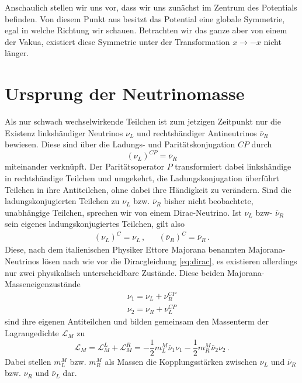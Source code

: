 Anschaulich stellen wir uns vor, dass wir uns zunächst im Zentrum des Potentials befinden.
Von diesem Punkt aus besitzt das Potential eine globale Symmetrie, egal in welche Richtung wir schauen.
Betrachten wir das ganze aber von einem der Vakua, existiert diese Symmetrie unter der Transformation $x \rightarrow -x$ nicht länger.

\section{Ursprung der Neutrinomasse} %

Als nur schwach wechselwirkende Teilchen ist zum jetzigen Zeitpunkt nur die Existenz linkshändiger Neutrinos $\nu_L$ und rechtshändiger Antineutrinos $\bar{\nu}_R$ bewiesen.
Diese sind über die Ladungs- und Paritätskonjugation $C P$ durch 
\begin{equation}
    (\nu_L)^{C P} = \bar{\nu}_R
    \label{eq:cpkonju}
\end{equation}
miteinander verknüpft.
Der Paritätsoperator $P$ transformiert dabei linkshändige in rechtshändige Teilchen und umgekehrt, die Ladungskonjugation überführt Teilchen in ihre Antiteilchen, ohne dabei ihre Händigkeit zu verändern.
Sind die ladungskonjugierten Teilchen zu $\nu_L$ bzw. $\bar{\nu}_R$ bisher nicht beobachtete, unabhängige Teilchen, sprechen wir von einem Dirac-Neutrino.
Ist $\nu_L$ bzw- $\bar{\nu}_R$ sein eigenes ladungskonjugiertes Teilchen, gilt also
\begin{align*}
    (\nu_L)^C = \nu_L \,, && (\bar{\nu}_R)^C = \bar{\nu}_R \,.
\end{align*}
Diese, nach dem italienischen Physiker Ettore Majorana benannten Majorana-Neutrinos lösen nach wie vor die Diracgleichung \eqref{eq:dirac}, es existieren allerdings nur zwei physikalisch unterscheidbare Zustände.
Diese beiden Majorana-Masseneigenzustände
\begin{align*}
    \nu_1 = \nu_L + \nu^{C P}_R \\
    \nu_2 = \nu_R + \nu^{C P}_L
\end{align*}
sind ihre eigenen Antiteilchen und bilden gemeinsam den Massenterm der Lagrangedichte $\mathcal{L}_M$ zu
\begin{equation}
    \mathcal{L}_M = \mathcal{L}^L_M + \mathcal{L}^R_M = -\frac{1}{2} m^M_L \bar{\nu}_1 \nu_1 - \frac{1}{2} m^M_R \bar{\nu}_2 \nu_2 \,.
    \label{eq:lagrangedichtemajo}
\end{equation}
Dabei stellen $m^M_L$ bzw. $m^M_R$ als Massen die Kopplungsstärken zwischen $\nu_L$ und $\bar{\nu}_R$ bzw. $\nu_R$ und $\bar{\nu}_L$ dar.

